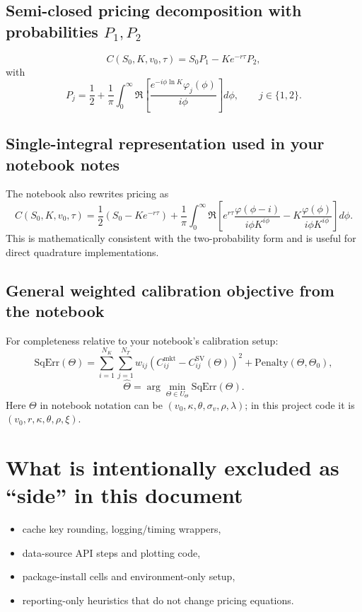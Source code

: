\documentclass[11pt]{article}
\begin{document}
\subsection{Semi-closed pricing decomposition with probabilities $P_1,P_2$}
\begin{equation}
C(S_0,K,v_0,\tau)=S_0P_1-Ke^{-r\tau}P_2,
\end{equation}
with
\begin{equation}
P_j=\frac12+\frac1\pi\int_0^{\infty}\Re\left[\frac{e^{-i\phi\ln K}\varphi_j(\phi)}{i\phi}\right]d\phi,
\qquad j\in\{1,2\}.
\end{equation}

\subsection{Single-integral representation used in your notebook notes}
The notebook also rewrites pricing as
\begin{equation}
C(S_0,K,v_0,\tau)=\frac12\left(S_0-Ke^{-r\tau}\right)
+\frac1\pi\int_0^{\infty}
\Re\left[
 e^{r\tau}\frac{\varphi(\phi-i)}{i\phi K^{i\phi}}
-K\frac{\varphi(\phi)}{i\phi K^{i\phi}}
\right]d\phi.
\end{equation}
This is mathematically consistent with the two-probability form and is useful for direct quadrature implementations.

\subsection{General weighted calibration objective from the notebook}
For completeness relative to your notebook's calibration setup:
\begin{equation}
\mathrm{SqErr}(\Theta)=\sum_{i=1}^{N_K}\sum_{j=1}^{N_T}
 w_{ij}\left(C^{\text{mkt}}_{ij}-C^{\text{SV}}_{ij}(\Theta)\right)^2
+\mathrm{Penalty}(\Theta,\Theta_0),
\end{equation}
\begin{equation}
\hat{\Theta}=\arg\min_{\Theta\in U_\Theta}\mathrm{SqErr}(\Theta).
\end{equation}
Here $\Theta$ in notebook notation can be $(v_0,\kappa,\theta,\sigma_v,\rho,\lambda)$; in this project code it is $(v_0,r,\kappa,\theta,\rho,\xi)$.

\section*{What is intentionally excluded as ``side'' in this document}
\begin{itemize}[leftmargin=2em]
    \item cache key rounding, logging/timing wrappers,
    \item data-source API steps and plotting code,
    \item package-install cells and environment-only setup,
    \item reporting-only heuristics that do not change pricing equations.
\end{itemize}
\end{document}
